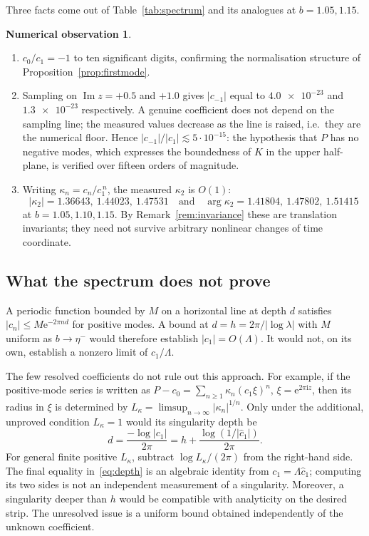 \documentclass[11pt,a4paper]{article}
\theoremstyle{definition}
\newtheorem{observation}[theorem]{Numerical observation}
\newcommand{\Kk}{K}
\newcommand{\eee}{\mathrm{e}}
\newcommand{\ii}{\mathrm{i}}
\newcommand{\chat}{\hat{c}_1}
\begin{document}
Three facts come out of Table~\ref{tab:spectrum} and its analogues at
$b=1.05,1.15$.

\begin{observation}\label{obs:spectrum}
\ \begin{enumerate}
\item $c_0/c_1=-1$ to ten significant digits, confirming the normalisation
  structure of Proposition~\ref{prop:firstmode}.
\item Sampling on $\operatorname{Im}z=+0.5$ and $+1.0$ gives $|c_{-1}|$ equal to
  $\num{4.0e-23}$ and $\num{1.3e-23}$ respectively.  A genuine coefficient does
  not depend on the sampling line; the measured values decrease as the line is
  raised, i.e.\ they are the numerical floor.  Hence
  $|c_{-1}|/|c_1|\lesssim5\cdot10^{-15}$: the hypothesis that $P$ has no
  negative modes, which expresses the boundedness of $\Kk$ in the upper
  half-plane, is verified over fifteen orders of magnitude.
\item Writing $\kappa_n=c_n/c_1^{\,n}$, the measured $\kappa_2$ is $O(1)$:
  \[
    |\kappa_2|=1.36643,\ 1.44023,\ 1.47531
    \quad\text{and}\quad
    \arg\kappa_2=1.41804,\ 1.47802,\ 1.51415
  \]
  at $b=1.05,1.10,1.15$.  By Remark~\ref{rem:invariance} these are translation
  invariants; they need not survive arbitrary nonlinear changes of time coordinate.
\end{enumerate}
\end{observation}

\subsection{What the spectrum does not prove}\label{sec:nostrip}

A periodic function bounded by $M$ on a horizontal line at depth $d$ satisfies
$|c_n|\le M\eee^{-2\pi nd}$ for positive modes.  A bound at
$d=h=2\pi/|\log\lambda|$ with $M$ uniform as $b\to\eta^-$ would therefore
establish $|c_1|=O(\Lambda)$.  It would not, on its own, establish a nonzero
limit of $c_1/\Lambda$.

The few resolved coefficients do not rule out this approach.  For example,
if the positive-mode series is written as
$P-c_0=\sum_{n\ge1}\kappa_n(c_1\xi)^n$, $\xi=\eee^{2\pi\ii z}$,
then its radius in $\xi$ is determined by
$L_\kappa=\limsup_{n\to\infty}|\kappa_n|^{1/n}$.
Only under the additional, unproved condition $L_\kappa=1$ would its
singularity depth be
\begin{equation}\label{eq:depth}
 d=\frac{-\log|c_1|}{2\pi}
   =h+\frac{\log(1/|\chat|)}{2\pi}.
\end{equation}
For general finite positive $L_\kappa$, subtract
$\log L_\kappa/(2\pi)$ from the right-hand side.  The final equality
in~\eqref{eq:depth} is an algebraic identity from $c_1=\Lambda\chat$;
computing its two sides is not an independent measurement of a singularity.
Moreover, a singularity deeper than $h$ would be compatible with analyticity
on the desired strip.  The unresolved issue is a uniform bound obtained
independently of the unknown coefficient.
\end{document}
